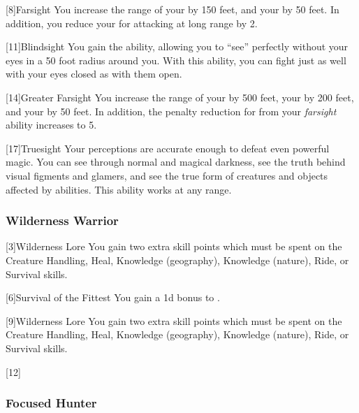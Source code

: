             [8]{Farsight}
            You increase the range of your  by 150 feet, and your  by 50 feet.
            In addition, you reduce your  for attacking at long range by 2.

            [11]{Blindsight}
            You gain the  ability, allowing you to ``see'' perfectly without your eyes in a 50 foot radius around you.
            With this ability, you can fight just as well with your eyes closed as with them open.

            [14]{Greater Farsight}
            You increase the range of your  by 500 feet, your  by 200 feet, and your  by 50 feet.
            In addition, the penalty reduction for  from your \textit{farsight} ability increases to 5.

            [17]{Truesight} 
            Your perceptions are accurate enough to defeat even powerful magic.
            You can see through normal and magical darkness, see the truth behind visual figments and glamers, and see the true form of creatures and objects affected by  abilities.
            This ability works at any range.

        \subsubsection{Wilderness Warrior}
            [3]{Wilderness Lore} You gain two extra skill points which must be spent on the Creature Handling, Heal, Knowledge (geography), Knowledge (nature), Ride, or Survival skills.

            [6]{Survival of the Fittest}
            You gain a \plus1d bonus to .

            [9]{Wilderness Lore} You gain two extra skill points which must be spent on the Creature Handling, Heal, Knowledge (geography), Knowledge (nature), Ride, or Survival skills.

            [12]{} 

        \subsubsection{Focused Hunter}

